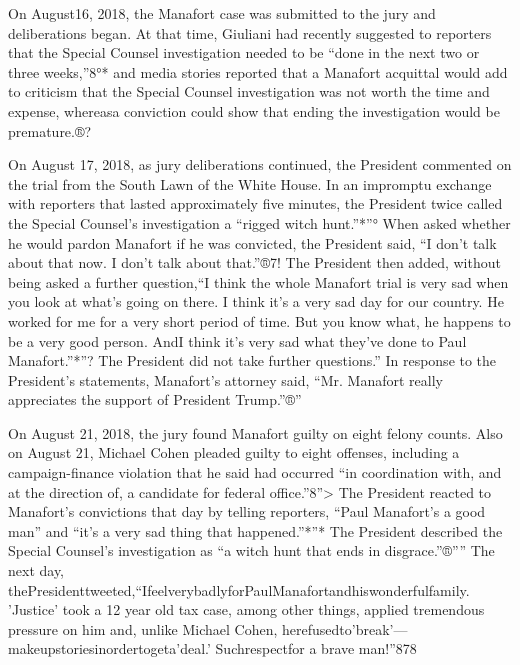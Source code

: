 On August16, 2018, the Manafort case was submitted to the jury and deliberations began.
At that time, Giuliani had recently suggested to reporters that the Special Counsel investigation needed to be “done in the next two or three weeks,”8°*
and media stories reported that a Manafort acquittal would add to criticism that the Special Counsel investigation was not worth the time and expense, whereasa conviction could show that ending the investigation would be premature.®?

On August 17, 2018, as jury deliberations continued, the President commented on the trial from the South Lawn of the White House.
In an impromptu exchange with reporters that lasted approximately five minutes, the President twice called the Special Counsel's investigation a “rigged witch hunt.”*”°
When asked whether he would pardon Manafort if he was convicted, the President said, “I don't talk about that now.
I don't talk about that.”®7!
The President then added, without being asked a further question,“I think the whole Manafort trial is very sad when you look at what's going on there.
I think it's a very sad day for our country.
He worked for me for a very short period of time.
But you know what, he happens to be a very good person.
AndI think it's very sad what they've done to Paul Manafort.”*”?
The President did not take further questions.”
In response to the President's statements, Manafort's attorney said, “Mr. Manafort really appreciates the support of President Trump.”®”

On August 21, 2018, the jury found Manafort guilty on eight felony counts.
Also on August 21, Michael Cohen pleaded guilty to eight offenses, including a campaign-finance violation that he said had occurred “in coordination with, and at the direction of, a candidate for federal office.”8”>
The President reacted to Manafort's convictions that day by telling reporters, “Paul Manafort's a good man” and “it's a very sad thing that happened.”*”*
The President described the Special Counsel's investigation as “a witch hunt that ends in disgrace.”®””
The next day, thePresidenttweeted,“IfeelverybadlyforPaulManafortandhiswonderfulfamily.
'Justice' took a 12 year old tax case, among other things, applied tremendous pressure on him and, unlike Michael Cohen, herefusedto'break'—makeupstoriesinordertogeta'deal.'
Suchrespectfor a brave man!”878

